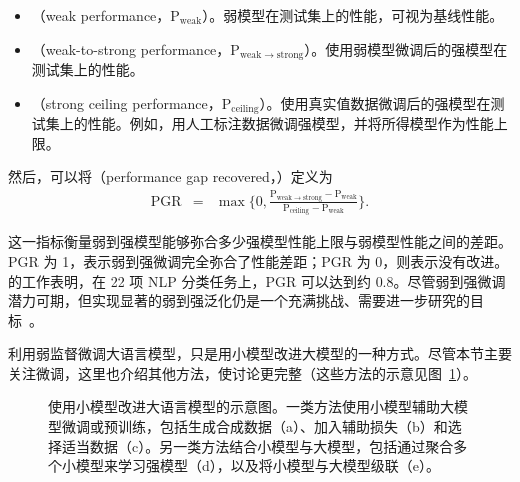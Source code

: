 \begin{itemize}
\item \vspace{0.5em} （weak performance，$\mathrm{P}_{\mathrm{weak}}$）。弱模型在测试集上的性能，可视为基线性能。
\item \vspace{0.3em} （weak-to-strong performance，$\mathrm{P}_{\mathrm{weak} \to \mathrm{strong}}$）。使用弱模型微调后的强模型在测试集上的性能。
\item \vspace{0.3em} （strong ceiling performance，$\mathrm{P}_{\mathrm{ceiling}}$）。使用真实值数据微调后的强模型在测试集上的性能。例如，用人工标注数据微调强模型，并将所得模型作为性能上限。
\end{itemize}
\vspace{0.5em}

然后，可以将（performance gap recovered，）定义为
\begin{eqnarray}
\mathrm{PGR} & = & \max \Big\{0, \frac{\mathrm{P}_{\mathrm{weak} \to \mathrm{strong}} - \mathrm{P}_{\mathrm{weak}}}{\mathrm{P}_{\mathrm{ceiling}} - \mathrm{P}_{\mathrm{weak}}} \Big\}.
\end{eqnarray}

这一指标衡量弱到强模型能够弥合多少强模型性能上限与弱模型性能之间的差距。PGR 为 1，表示弱到强微调完全弥合了性能差距；PGR 为 0，则表示没有改进。\citet{burns-etal:2023weak} 的工作表明，在 22 项 NLP 分类任务上，$\mathrm{PGR}$ 可以达到约 $0.8$。尽管弱到强微调潜力可期，但实现显著的弱到强泛化仍是一个充满挑战、需要进一步研究的目标~\cite{aschenbrenner:2024situational}。

利用弱监督微调大语言模型，只是用小模型改进大模型的一种方式。尽管本节主要关注微调，这里也介绍其他方法，使讨论更完整（这些方法的示意见图~\ref{fig:small-to-large-improvement}）。

\begin{figure}[!t]
\centering

\caption{使用小模型改进大语言模型的示意图。一类方法使用小模型辅助大模型微调或预训练，包括生成合成数据（a）、加入辅助损失（b）和选择适当数据（c）。另一类方法结合小模型与大模型，包括通过聚合多个小模型来学习强模型（d），以及将小模型与大模型级联（e）。}
\label{fig:small-to-large-improvement}
\end{figure}

